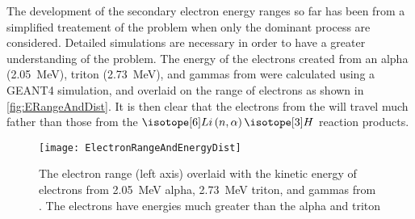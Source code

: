 The development of the secondary electron energy ranges so far has been from a simplified treatement of the problem when only the dominant process are considered.
Detailed simulations are necessary in order to have a greater understanding of the problem. 
The energy of the electrons created from an alpha (\SI{2.05}{\MeV}), triton (\SI{2.73}{\MeV}), and gammas from  were calculated using a GEANT4 simulation, and overlaid on the range of electrons as shown in \autoref{fig:ERangeAndDist}.
It is then clear that the electrons from the  will travel much father than those from the $\iso[6]{Li}\left(n,\alpha\right)\iso[3]{H}$ reaction products.
\begin{figure}
  \centering
  \texttt{[image: ElectronRangeAndEnergyDist]}
  \caption[Electron Range and Energy Distribution of Selected Reactions]{The electron range (left axis) overlaid with the kinetic energy of electrons from \SI{2.05}{\MeV} alpha, \SI{2.73}{\MeV} triton, and gammas from . The  electrons have energies much greater than the alpha and triton}
  \label{fig:ERangeAndDist}
\end{figure}
